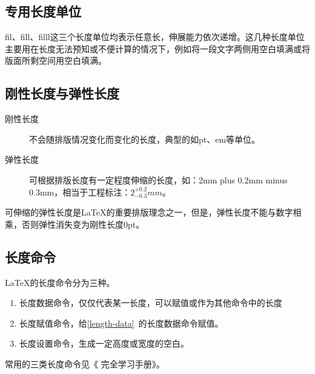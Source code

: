 \subsection*{专用长度单位}
fil、fill、filll这三个长度单位均表示任意长，伸展能力依次递增。这几种长度单位主要用在长度无法预知或不便计算的情况下，例如将一段文字两侧用空白填满或将版面所剩空间用空白填满。

\subsection*{刚性长度与弹性长度}

\begin{description}
    \item[刚性长度] 不会随排版情况变化而变化的长度，典型的如pt、em等单位。
    \item[弹性长度] 可根据排版长度有一定程度伸缩的长度，如：2mm plus 0.2mm minus 0.3mm，相当于工程标注：$ 2^{+0.2}_{-0.3}mm $。
\end{description}

可伸缩的弹性长度是\LaTeX{}的重要排版理念之一，但是，弹性长度不能与数字相乘，否则弹性消失变为刚性长度0pt。

\subsection*{长度命令}
\LaTeX{}的长度命令分为三种。

\begin{enumerate}[label=(\arabic*)]
    \item 长度数据命令，仅仅代表某一长度，可以赋值或作为其他命令中的长度\label{length-data}
    \item 长度赋值命令，给\autoref{length-data}~的长度数据命令赋值。
    \item 长度设置命令，生成一定高度或宽度的空白。
\end{enumerate}

常用的三类长度命令见《  \LaTeXe{}完全学习手册》\cite{胡伟}。

